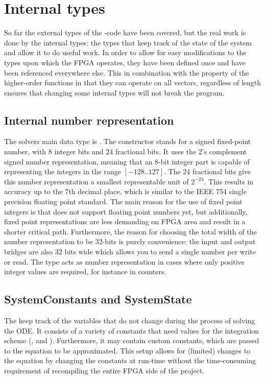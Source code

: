\section{Internal types}
So far the external types of the \clash{}-code have been covered, but the real work is done by the internal types: the types that keep track of the state of the system and allow it to do useful work. In order to allow for easy modifications to the types upon which the FPGA operates, they have been defined once and have been referenced everywhere else. This in combination with the property of the higher-order functions in \clash{} that they can operate on all vectors, regardless of length ensures that changing some internal types will not break the program.

\subsection{Internal number representation}
The solvers main data type is . The constructor  stands for a signed fixed-point number, with 8 integer bits and 24 fractional bits. It uses the 2's complement signed number representation, meaning that an 8-bit integer part is capable of representing the integers in the range $[-128..127]$. The 24 fractional bits give this number representation a smallest representable unit of $2^{-24}$. This results in accuracy up to the 7th decimal place, which is similar to the IEEE 754 single precision floating point standard. The main reason for the use of fixed point integers is that \clash{} does not support floating point numbers yet, but additionally, fixed point representations are less demanding on FPGA area and result in a shorter critical path. Furthermore, the reason for choosing the total width of the number representation to be 32-bits is purely convenience: the input and output bridges are also 32 bits wide which allows you to send a single number per write or read. The  type acts as number representation in cases where only positive integer values are required, for instance in counters.

\subsection{SystemConstants and SystemState}
The  keep track of the variables that do not change during the process of solving the ODE. It consists of a variety of constants that need values for the integration scheme (,  and ). Furthermore, it may contain custom constants, which are passed to the equation to be approximated. This setup allows for (limited) changes to the equation by changing the constants at run-time without the time-consuming requirement of recompiling the entire FPGA side of the project.


